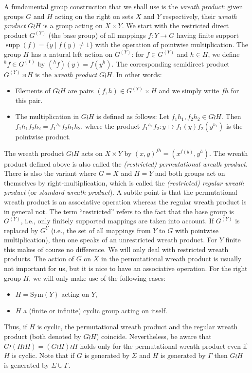 \documentclass[10pt,a4paper]{article}
\newcommand{\supp}{\operatorname{supp}}
\newcommand{\Sym}[1]{\mathrm{Sym}({#1})}
\begin{document}
A fundamental group construction that we shall use is the \emph{wreath product}: 
given groups $G$ and $H$ acting on the right on sets $X$ and $Y$ respectively, their
\emph{wreath product} $G\wr H$ is a group acting on $X\times Y$. 
We start with the restricted direct product $G^{(Y)}$ (the base group) of all mappings $f : Y \to G$ having finite support
$\supp(f) = \{ y \mid f(y) \neq 1 \}$ with the operation of pointwise multiplication. 
The group $H$ has a natural left action on
$G^{(Y)}$: for $f \in G^{(Y)}$ and $h \in H$, we define ${}^h\!f \in G^{(Y)}$ by $({}^h\!f)(y) = f(y^h)$. 
The corresponding semidirect product $G^{(Y)} \rtimes H$ is the \emph{wreath product} $G \wr H$.  In other words:
\begin{itemize}
\item
Elements of $G \wr H$ are pairs $(f,h) \in G^{(Y)} \times H$ and we simply write $fh$ for this pair.
\item
The multiplication in $G \wr H$ is defined as follows:
Let $f_1h_1, f_2h_2 \in G \wr H$. Then
$f_1h_1f_2h_2 = f_1 {}^{h_1}\!\!f_2 h_1h_2$, where
the product $f_1 {}^{h_1}\!\!f_2\colon y \mapsto f_1(y) f_2(y^{h_1})$ is the pointwise product.
\end{itemize}
The wreath product $G \wr H$ acts on $X \times Y$ by $(x,y)^{fh} = (x^{f(y)},y^h)$.
The wreath product defined above is also called the {\em (restricted) permutational wreath product}. 
There is also the variant where $G=X$ and $H=Y$ and both groups act on themselves by right-multiplication, which is called
the {\em (restricted) regular wreath product} (or {\em standard wreath product}). A subtle point is that the permutational wreath product is an associative operation whereas
the regular wreath product is in general not. The term ``restricted'' refers to the fact that the base group is $G^{(Y)}$, i.e., only finitely supported mappings are taken into account.
If $G^{(Y)}$ is replaced by $G^Y$ (i.e., the set of all mappings from $Y$ to $G$ with pointwise multiplication), then one speaks of an unrestricted wreath product.
For $Y$ finite this makes of course no difference.
We will only deal with restricted wreath products.
The action of $G$ on $X$ in the permutational wreath product is usually not important for us, but it is nice to have an associative
operation. For the right group $H$, we will only make use of the following cases: 
\begin{itemize}
\item $H = \Sym Y$ acting on $Y$,
\item $H$ a (finite or infinite) cyclic group acting on itself.
\end{itemize}
Thus, if $H$ is cyclic, the permutational wreath product and the regular wreath product (both denoted by $G \wr H$) coincide. Nevertheless, be aware that $G \wr (H \wr H) = (G \wr H) \wr H$ holds only for the permutational wreath product even if $H$ is cyclic. 
Note that if $G$ is generated by $\Sigma$ and $H$ is generated by $\Gamma$ then $G \wr H$ is 
generated by $\Sigma \cup \Gamma$.
\end{document}
